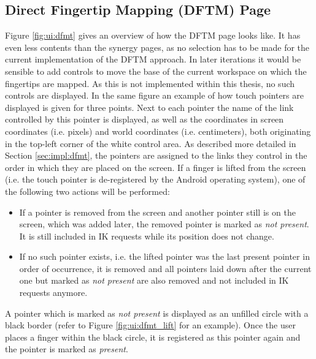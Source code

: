 \subsection{Direct Fingertip Mapping (DFTM) Page}

Figure \ref{fig:ui:dfmt} gives an overview of how the DFTM page looks like. It has even less contents than the synergy pages, as no selection has to be made for the current implementation of the DFTM approach. In later iterations it would be sensible to add controls to move the base of the current workspace on which the fingertips are mapped. As this is not implemented within this thesis, no such controls are displayed. In the same figure an example of how touch pointers are displayed is given for three points. Next to each pointer the name of the link controlled by this pointer is displayed, as well as the coordinates in screen coordinates (i.e. pixels) and world coordinates (i.e. centimeters), both originating in the top-left corner of the white control area. As described more detailed in Section \ref{sec:impl:dfmt}, the pointers are assigned to the links they control in the order in which they are placed on the screen.
If a finger is lifted from the screen (i.e. the touch pointer is de-registered by the Android operating system), one of the following two actions will be performed:
\begin{itemize}
	\item If a pointer is removed from the screen and another pointer still is on the screen, which was added later, the removed pointer is marked as \textit{not present}. It is still included in IK requests while its position does not change.
	\item If no such pointer exists, i.e. the lifted pointer was the last present pointer in order of occurrence, it is removed and all pointers laid down after the current one but marked as \textit{not present} are also removed and not included in IK requests anymore.
\end{itemize}

A pointer which is marked as \textit{not present} is displayed as an unfilled circle with a black border (refer to Figure \ref{fig:ui:dfmt_lift} for an example). Once the user places a finger within the black circle, it is registered as this pointer again and the pointer is marked as \textit{present}.

